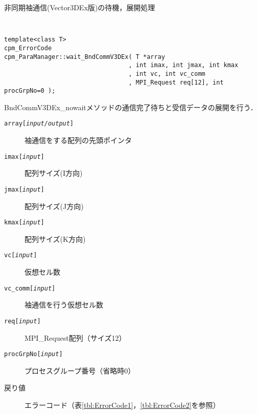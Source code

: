 \begin{spacing}{0.8}
\begin{itembox}[l]{非同期袖通信(Vector3DEx版)の待機，展開処理}
{\tt
\begin{verbatim}
template<class T>
cpm_ErrorCode
cpm_ParaManager::wait_BndCommV3DEx( T *array
                                  , int imax, int jmax, int kmax
                                  , int vc, int vc_comm
                                  , MPI_Request req[12], int procGrpNo=0 );
\end{verbatim}
}
BndCommV3DEx\_nowaitメソッドの通信完了待ちと受信データの展開を行う．
\begin{description}
\item[{\tt array[{\it input/output}]}] 袖通信をする配列の先頭ポインタ
\item[{\tt imax[{\it input}]}] 配列サイズ(I方向)
\item[{\tt jmax[{\it input}]}] 配列サイズ(J方向)
\item[{\tt kmax[{\it input}]}] 配列サイズ(K方向)
\item[{\tt vc[{\it input}]}] 仮想セル数
\item[{\tt vc\_comm[{\it input}]}] 袖通信を行う仮想セル数
\item[{\tt req[{\it input}]}] MPI\_Request配列（サイズ12）
\item[{\tt procGrpNo[{\it input}]}] プロセスグループ番号（省略時0）
\\
\item[戻り値] エラーコード（表\ref{tbl:ErrorCode1}，\ref{tbl:ErrorCode2}を参照）
\end{description}
\end{itembox}\\
\end{spacing}


